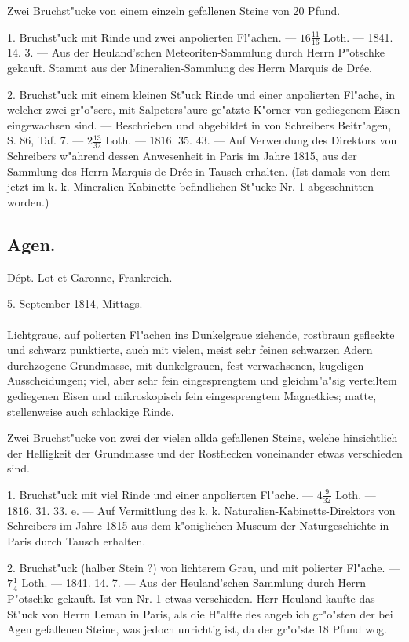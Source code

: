 \documentclass[a4paper, 11pt, oneside, polutonikogreek, german]{article}
\begin{document}
Zwei Bruchst"ucke von einem einzeln gefallenen Steine von 20 Pfund.

1. Bruchst"uck mit Rinde und zwei anpolierten Fl"achen. --- $16\frac{11}{16}$ Loth. --- 1841. 14. 3. --- Aus der Heuland'schen Meteoriten-Sammlung durch Herrn P"otschke gekauft. Stammt aus der Mineralien-Sammlung des Herrn Marquis de Drée.

2. Bruchst"uck mit einem kleinen St"uck Rinde und einer anpolierten Fl"ache, in welcher zwei gr"o"sere, mit Salpeters"aure ge"atzte K"orner von gediegenem Eisen eingewachsen sind. --- Beschrieben und abgebildet in von Schreibers Beitr"agen, S. 86, Taf. 7. --- $2\frac{13}{32}$ Loth. --- 1816. 35. 43. --- Auf Verwendung des Direktors von Schreibers w"ahrend dessen Anwesenheit in Paris im Jahre 1815, aus der Sammlung des Herrn Marquis de Drée in Tausch erhalten. (Ist damals von dem jetzt im k. k. Mineralien-Kabinette befindlichen St"ucke Nr. 1 abgeschnitten worden.)
\subsection{Agen.}
\begin{center}
\small
Dépt. Lot et Garonne, Frankreich.

5. September 1814, Mittags.
\end{center}
\paragraph{}
Lichtgraue, auf polierten Fl"achen ins Dunkelgraue ziehende, rostbraun gefleckte und schwarz punktierte, auch mit vielen, meist sehr feinen schwarzen Adern durchzogene Grundmasse, mit dunkelgrauen, fest verwachsenen, kugeligen Ausscheidungen; viel, aber sehr fein eingesprengtem und gleichm"a"sig verteiltem gediegenen Eisen und mikroskopisch fein eingesprengtem Magnetkies; matte, stellenweise auch schlackige Rinde.

Zwei Bruchst"ucke von zwei der vielen allda gefallenen Steine, welche hinsichtlich der Helligkeit der Grundmasse und der Rostflecken voneinander etwas verschieden sind.

1. Bruchst"uck mit viel Rinde und einer anpolierten Fl"ache. --- $4\frac{9}{32}$ Loth. --- 1816. 31. 33. e. --- Auf Vermittlung des k. k. Naturalien-Kabinetts-Direktors von Schreibers im Jahre 1815 aus dem k"oniglichen Museum der Naturgeschichte in Paris durch Tausch erhalten.

2. Bruchst"uck (halber Stein ?) von lichterem Grau, und mit polierter Fl"ache. --- $7\frac{1}{4}$ Loth. --- 1841. 14. 7. --- Aus der Heuland'schen Sammlung durch Herrn P"otschke gekauft. Ist von Nr. 1 etwas verschieden. Herr Heuland kaufte das St"uck von Herrn Leman in Paris, als die H"alfte des angeblich gr"o"sten der bei Agen gefallenen Steine, was jedoch unrichtig ist, da der gr"o"ste 18 Pfund wog.
\end{document}
